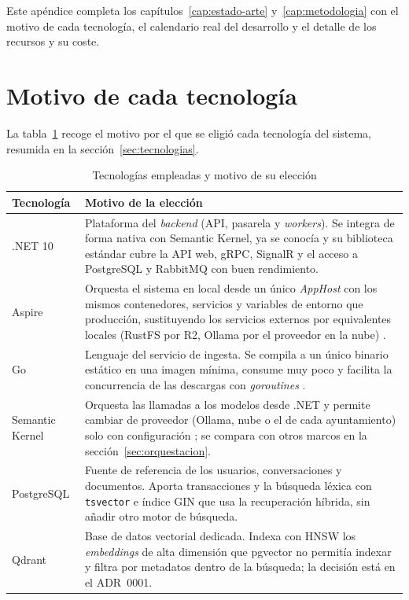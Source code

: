 \label{ap:planificacion}

Este apéndice completa los capítulos~\ref{cap:estado-arte} y~\ref{cap:metodologia} con el motivo de cada tecnología, el calendario real del desarrollo y el detalle de los recursos y su coste.

\section{Motivo de cada tecnología}

La tabla~\ref{tab:tecnologias} recoge el motivo por el que se eligió cada tecnología del sistema, resumida en la sección~\ref{sec:tecnologias}.

\begin{table}[htbp]
  \centering
  \caption{Tecnologías empleadas y motivo de su elección}
  \label{tab:tecnologias}
  \begin{tabularx}{\linewidth}{lX}
    \toprule
    Tecnología & Motivo de la elección \\
    \midrule
    .NET 10 & Plataforma del \emph{backend} (API, pasarela y \emph{workers}). Se integra de forma nativa con Semantic Kernel, ya se conocía y su biblioteca estándar cubre la API web, gRPC, SignalR y el acceso a PostgreSQL y RabbitMQ con buen rendimiento. \\
    Aspire & Orquesta el sistema en local desde un único \emph{AppHost} con los mismos contenedores, servicios y variables de entorno que producción, sustituyendo los servicios externos por equivalentes locales (RustFS por R2, Ollama por el proveedor en la nube) \cite{aspire}. \\
    Go & Lenguaje del servicio de ingesta. Se compila a un único binario estático en una imagen mínima, consume muy poco y facilita la concurrencia de las descargas con \emph{goroutines} \cite{golang}. \\
    Semantic Kernel & Orquesta las llamadas a los modelos desde .NET y permite cambiar de proveedor (Ollama, nube o el de cada ayuntamiento) solo con configuración \cite{semantickernel}; se compara con otros marcos en la sección~\ref{sec:orquestacion}. \\
    PostgreSQL & Fuente de referencia de los usuarios, conversaciones y documentos. Aporta transacciones y la búsqueda léxica con \texttt{tsvector} e índice GIN que usa la recuperación híbrida, sin añadir otro motor de búsqueda. \\
    Qdrant & Base de datos vectorial dedicada. Indexa con HNSW los \emph{embeddings} de alta dimensión que pgvector no permitía indexar y filtra por metadatos dentro de la búsqueda; la decisión está en el ADR~0001. \\

\end{tabularx}
\end{table}
